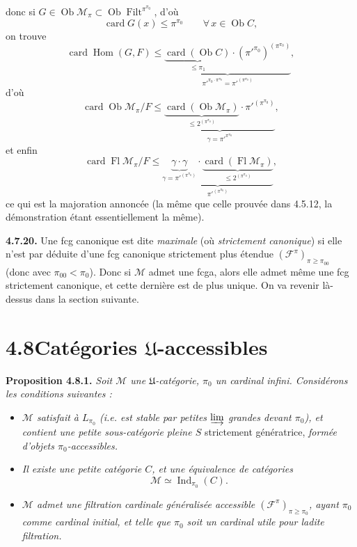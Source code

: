 \documentclass[11pt]{article}
\newcommand{\msp}[1]{\marginpar{\footnotesize [#1]}}
\newcommand{\Filt}{\operatorname{Filt}}
\newcommand{\card}{\operatorname{card}}
\newcommand{\Fl}{\operatorname{Fl}}
\newcommand{\Ob}{\operatorname{Ob}}
\newcommand{\Ind}{\operatorname{Ind}}
\newcommand{\Hom}{\operatorname{Hom}}
\begin{document}
donc si $G \in \Ob \mathcal{M}_\pi \subset \Ob \Filt^{\pi^{\pi_0}}$, d'où
\[ \card G(x) \leqslant \pi^{\pi_0} \qquad \forall\, x \in \Ob C , \]
on trouve
\[ \card \Hom(G,F) \leqslant \underbrace{\underbrace{\card(\Ob C)}_{\leqslant \pi_1}\cdot(\pi'^{\pi_0})^{(\pi^{\pi_0})}}_{\pi'^{\pi_0\cdot\pi^{\pi_0}} = \pi'^{(\pi^{\pi_0})}} , \]
d'où
\[ \card \Ob \mathcal{M}_\pi/F \leqslant \underbrace{\underbrace{\card(\Ob \mathcal{M}_\pi)}_{\leqslant 2^{(\pi^{\pi_0})}}\cdot\pi'^{(\pi^{\pi_0})}}_{\gamma = \pi'^{\pi^{\pi_0}}} , \]
et enfin
\[ \card \Fl \mathcal{M}_\pi/F \leqslant \underbrace{\underbrace{\gamma\cdot\gamma}_{\gamma = \pi'^{(\pi^{\pi_0})}}\cdot\underbrace{\card(\Fl \mathcal{M}_\pi)}_{\leqslant 2^{(\pi^{\pi_0})}}}_{\pi'^{(\pi^{\pi_0})}} , \]
ce qui est la majoration annoncée (la même que celle prouvée dans 4.5.12, la démonstration étant essentiellement la même).

\msp{page 187}

\textbf{4.7.20.} Une fcg canonique est dite \textit{maximale} (où \textit{strictement canonique}) si elle n'est par déduite d'une fcg canonique strictement plus étendue $(\mathcal{F}^\pi)_{\pi\geqslant\pi_{00}}$ (donc avec $\pi_{00} < \pi_0$). Donc si $\mathcal{M}$ admet une fcga, alors elle admet même une fcg strictement canonique, et cette dernière est de plus unique. On va revenir là-dessus dans la section suivante. %

\section*{4.8\quad Catégories $\mathfrak{U}$-accessibles}

\textbf{Proposition 4.8.1.} \textit{Soit $\mathcal{M}$ une $\mathfrak{U}$-catégorie, $\pi_0$ un cardinal infini. Considérons les conditions suivantes :}
\begin{itemize}[label={}]
\item[\textit{a)}] \textit{$\mathcal{M}$ satisfait à $L_{\pi_0}$ (i.e. est stable par petites $\varinjlim$ grandes devant $\pi_0$), et contient une petite sous-catégorie pleine $S$} strictement génératrice, \textit{formée d'objets $\pi_0$-accessibles.}
\item[\textit{b)}] \textit{Il existe une petite catégorie $C$, et une équivalence de catégories}
\[ \mathcal{M} \simeq \Ind_{\pi_0}(C) . \]
\item[\textit{c)}] \textit{$\mathcal{M}$ admet une filtration cardinale généralisée accessible $(\mathcal{F}^\pi)_{\pi\geqslant\pi_0}$, ayant $\pi_0$ comme cardinal initial, et telle que $\pi_0$ soit un cardinal utile pour ladite filtration.}
\end{itemize}
\end{document}
